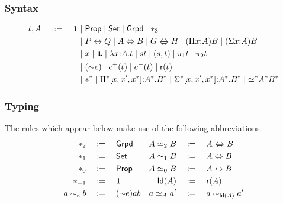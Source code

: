 \documentclass[12pt]{scrartcl}
\newcommand{\leqg}{{\lambda{\simeq}_2}}
\newcommand{\unitt}{{\boldsymbol{1}}}
\newcommand{\idof}[1]{\mathsf{Id}{(#1)}}
\newcommand{\props}{\mathsf{Prop}}
\newcommand{\sets}{\mathsf{Set}}
\newcommand{\grpds}{\mathsf{Grpd}}
\newcommand{\TLRA}{\Lleftarrow\!\!\!\!\!\Rrightarrow}
\newcommand{\gequiv}{\TLRA}
\begin{document}
\pagestyle{empty}
\thispagestyle{empty}
\section*{\fbox{$\boldsymbol{\leqg}$}}
\subsubsection*{Syntax}
\begin{align*}
  t, A \quad ::= \quad \unitt &\mid \props \mid \sets \mid \grpds \mid
  \sta_3\\
&\mid P \lra Q \mid A \LRA B \mid G \gequiv H \mid (\Pi x {:} A) B \mid (\Sigma x {:} A) B \\
&\mid x \mid \ttt \mid \lambda x {:}A.t \mid s t \mid (s,t) \mid \pi_1 t \mid \pi_2 t \\
&\mid ({\sim}e) \mid e^+(t) \mid e^-(t) \mid \refl{t}\\
&\mid \sta^{\sta} \mid \Pi^* [x,x',x^*] {:} A^*. B^*
\mid \Sigma^* [x,x',x^*] {:} A^*. B^*
\mid {\ee{}^*} A^* B^*
\end{align*}
\subsubsection*{Typing}
The rules which appear below make use of the following
abbreviations.
\begin{align*}
\sta_2 &\df \grpds &
A \simeq_2 B &\df A \gequiv B \\
\sta_1 &\df \sets &
A \simeq_1 B &\df A  \LRA B\\
\sta_0 &\df \props &
A \simeq_0 B &\df A \lra B\\
\sta_{-1} &\df \unitt &
\idof{A} &\df \refl{A}\\
 a \sim_e b &\df ({\sim} e) a b&
a \ee A a' &\df a \sim_{\idof{A}} a'\\
\end{align*}

\begin{prooftree}
\end{prooftree}
\end{document}
